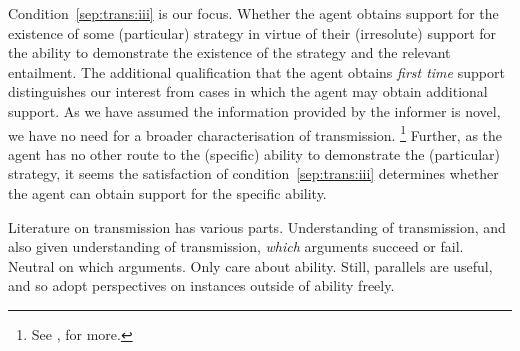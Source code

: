\documentclass[10pt]{article}
\begin{document}
\begin{note}
  Condition~\ref{sep:trans:iii} is our focus.
  Whether the agent obtains support for the existence of some (particular) strategy in virtue of their (irresolute) support for the ability to demonstrate the existence of the strategy and the relevant entailment.
  The additional qualification that the agent obtains \emph{first time} support distinguishes our interest from cases in which the agent may obtain additional support.
  As we have assumed the information provided by the informer is novel, we have no need for a broader characterisation of transmission.\nolinebreak
  \footnote{
    See \textcite{Moretti:2018we,Moretti:2013wd}, for more.
  }
  Further, as the agent has no other route to the (specific) ability to demonstrate the (particular) strategy, it seems the satisfaction of condition~\ref{sep:trans:iii} determines whether the agent can obtain support for the specific ability.
\end{note}

\begin{note}[Transmission]
  Literature on transmission has various parts.
  Understanding of transmission, and also given understanding of transmission, \emph{which} arguments succeed or fail.
  Neutral on which arguments.
  Only care about ability.
  Still, parallels are useful, and so adopt perspectives on instances outside of ability freely.
\end{note}
\end{document}
